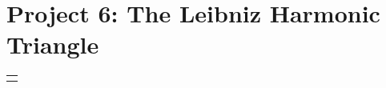 \documentclass[10pt,]{book}
\theoremstyle{plain}
\theoremstyle{definition}
\theoremstyle{definition}
\theoremstyle{definition}
\numberwithin{equation}{chapter}
\newlength{\panelmax}
\begin{document}
\section[{Project 6: The Leibniz Harmonic Triangle}]{Project 6: The Leibniz Harmonic Triangle}\label{exercises-6}
{%
\setlength{\panelmax}{0pt}
\ifdefined\panelboxAtabular\else\newsavebox{\panelboxAtabular}\fi%
\ifdefined\phAtabular\else\newlength{\phAtabular}\fi%
\setlength{\phAtabular}{\ht\panelboxAtabular+\dp\panelboxAtabular}
\settototalheight{\phAtabular}{\usebox{\panelboxAtabular}}
\setlength{\panelmax}{\maxof{\panelmax}{\phAtabular}}
\leavevmode%
\setlength{\tabcolsep}{0\linewidth}
\par\medskip\noindent
\begin{tabular}{@{}*{1}{c}@{}}
\begin{minipage}[c][\panelmax][t]{1\linewidth}\usebox{\panelboxAtabular}\end{minipage}\end{tabular}\\
}%
\end{document}
